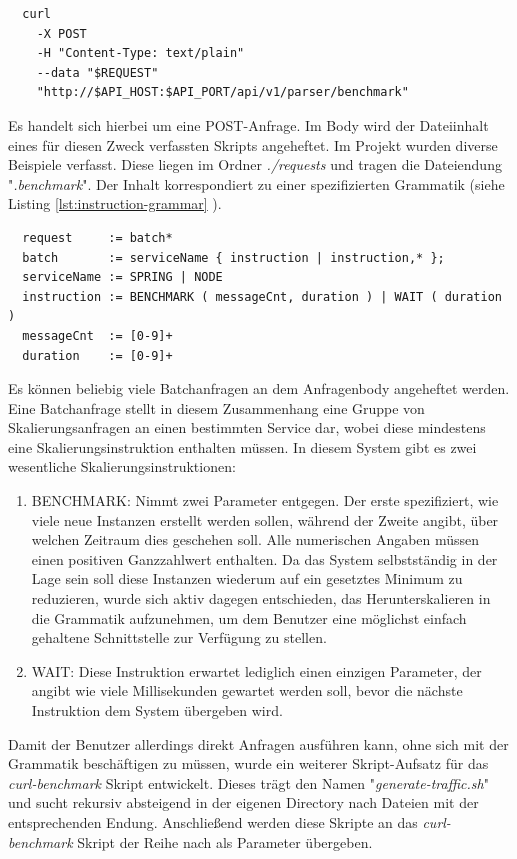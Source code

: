 \begin{verbatim}
  curl 
    -X POST 
    -H "Content-Type: text/plain" 
    --data "$REQUEST" 
    "http://$API_HOST:$API_PORT/api/v1/parser/benchmark"
\end{verbatim}

Es handelt sich hierbei um eine POST-Anfrage. Im Body wird der Dateiinhalt eines für diesen Zweck verfassten Skripts angeheftet. Im Projekt wurden diverse Beispiele verfasst. Diese liegen im Ordner \emph{./requests} und tragen die Dateiendung "\emph{.benchmark}". Der Inhalt korrespondiert zu einer spezifizierten Grammatik (siehe Listing \ref{lst:instruction-grammar} ).

\label{lst:instruction-grammar}
\begin{verbatim}
  request     := batch*
  batch       := serviceName { instruction | instruction,* };
  serviceName := SPRING | NODE
  instruction := BENCHMARK ( messageCnt, duration ) | WAIT ( duration )
  messageCnt  := [0-9]+
  duration    := [0-9]+
\end{verbatim}

Es können beliebig viele Batchanfragen an dem Anfragenbody angeheftet werden. Eine Batchanfrage stellt in diesem Zusammenhang eine Gruppe von Skalierungsanfragen an einen bestimmten Service dar, wobei diese mindestens eine Skalierungsinstruktion enthalten müssen. In diesem System gibt es zwei wesentliche Skalierungsinstruktionen: 

\begin{enumerate}
  \item BENCHMARK: Nimmt zwei Parameter entgegen. Der erste spezifiziert, wie viele neue Instanzen erstellt werden sollen, während der Zweite angibt, über welchen Zeitraum dies geschehen soll. Alle numerischen Angaben müssen einen positiven Ganzzahlwert enthalten. Da das System selbstständig in der Lage sein soll diese Instanzen wiederum auf ein gesetztes Minimum zu reduzieren, wurde sich aktiv dagegen entschieden, das Herunterskalieren in die Grammatik aufzunehmen, um dem Benutzer eine möglichst einfach gehaltene Schnittstelle zur Verfügung zu stellen.
  \item WAIT: Diese Instruktion erwartet lediglich einen einzigen Parameter, der angibt wie viele Millisekunden gewartet werden soll, bevor die nächste Instruktion dem System übergeben wird. 
\end{enumerate}


Damit der Benutzer allerdings direkt Anfragen ausführen kann, ohne sich mit der Grammatik beschäftigen zu müssen, wurde ein weiterer Skript-Aufsatz 
für das \emph{curl-benchmark} Skript entwickelt. Dieses trägt den Namen "\emph{generate-traffic.sh}" und sucht rekursiv absteigend in der eigenen Directory nach Dateien mit der entsprechenden Endung. Anschließend werden diese Skripte an das \emph{curl-benchmark} Skript der Reihe nach als Parameter übergeben.

